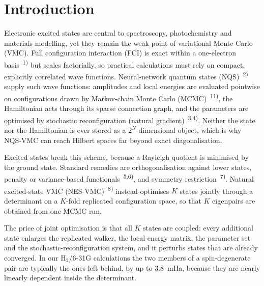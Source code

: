 \documentclass[10pt,a4paper]{article}
\begin{document}

\section{Introduction}

Electronic excited states are central to spectroscopy, photochemistry and materials modelling, yet they remain the weak point of variational Monte Carlo (VMC). Full configuration interaction (FCI) is exact within a one-electron basis\ \textsuperscript{1)} but scales factorially, so practical calculations must rely on compact, explicitly correlated wave functions. Neural-network quantum states (NQS)\ \textsuperscript{2)} supply such wave functions: amplitudes and local energies are evaluated pointwise on configurations drawn by Markov-chain Monte Carlo (MCMC)\ \textsuperscript{11)}, the Hamiltonian acts through its sparse connection graph, and the parameters are optimised by stochastic reconfiguration (natural gradient)\ \textsuperscript{3,4)}. Neither the state nor the Hamiltonian is ever stored as a $2^N$-dimensional object, which is why NQS-VMC can reach Hilbert spaces far beyond exact diagonalisation.

Excited states break this scheme, because a Rayleigh quotient is minimised by the ground state. Standard remedies are orthogonalisation against lower states, penalty or variance-based functionals\ \textsuperscript{5,6)}, and symmetry restriction\ \textsuperscript{7)}. Natural excited-state VMC (NES-VMC)\ \textsuperscript{8)} instead optimises $K$ states jointly through a determinant on a $K$-fold replicated configuration space, so that $K$ eigenpairs are obtained from one MCMC run.

The price of joint optimisation is that all $K$ states are coupled: every additional state enlarges the replicated walker, the local-energy matrix, the parameter set and the stochastic-reconfiguration system, and it perturbs states that are already converged. In our H$_2$/6-31G calculations the two members of a spin-degenerate pair are typically the ones left behind, by up to 3.8~mHa, because they are nearly linearly dependent inside the determinant.
\end{document}

